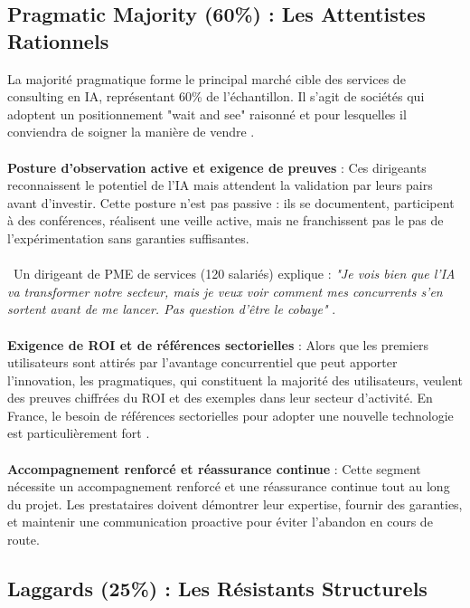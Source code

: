 \subsection{Pragmatic Majority (60\%) : Les Attentistes Rationnels}

La majorité pragmatique forme le principal marché cible des services de consulting en IA, représentant 60\% de l'échantillon. Il s'agit de sociétés qui adoptent un positionnement "wait and see" raisonné et pour lesquelles il conviendra de soigner la manière de vendre \cite{moore2014crossing}. 
\\\\
\textbf{Posture d'observation active et exigence de preuves} : Ces dirigeants reconnaissent le potentiel de l'IA mais attendent la validation par leurs pairs avant d'investir. Cette posture n'est pas passive : ils se documentent, participent à des conférences, réalisent une veille active, mais ne franchissent pas le pas de l'expérimentation sans garanties suffisantes.
\\\\\
Un dirigeant de PME de services (120 salariés) explique : \emph{"Je vois bien que l'IA va transformer notre secteur, mais je veux voir comment mes concurrents s'en sortent avant de me lancer. Pas question d'être le cobaye"} \cite{luwai2025meetings}.
\\\\
\textbf{Exigence de ROI et de références sectorielles} : Alors que les premiers utilisateurs sont attirés par l'avantage concurrentiel que peut apporter l'innovation, les pragmatiques, qui constituent la majorité des utilisateurs, veulent des preuves chiffrées du ROI et des exemples dans leur secteur d'activité. En France, le besoin de références sectorielles pour adopter une nouvelle technologie est particulièrement fort \cite{hofstede2001culture}.
\\\\
\textbf{Accompagnement renforcé et réassurance continue} : Cette segment nécessite un accompagnement renforcé et une réassurance continue tout au long du projet. Les prestataires doivent démontrer leur expertise, fournir des garanties, et maintenir une communication proactive pour éviter l'abandon en cours de route.

\subsection{Laggards (25\%) : Les Résistants Structurels}

